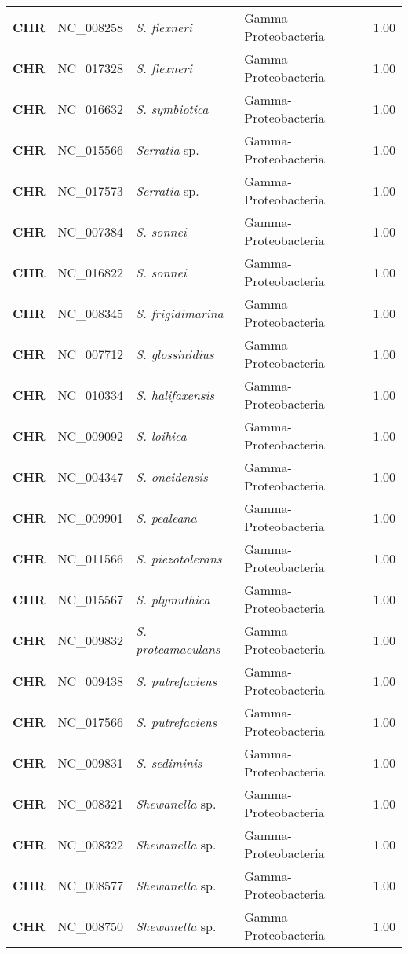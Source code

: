 \begin{adjustwidth}{-3cm}{2cm}
{\begin{supertabular}{>{\bfseries}l|p{0.1\textwidth}p{0.14\textwidth}l|l}
CHR & NC\_008258 & \textit{S. flexneri} & Gamma-Proteobacteria & 1.00\\
CHR & NC\_017328 & \textit{S. flexneri} & Gamma-Proteobacteria & 1.00\\
CHR & NC\_016632 & \textit{S. symbiotica} & Gamma-Proteobacteria & 1.00\\
CHR & NC\_015566 & \textit{Serratia} sp. & Gamma-Proteobacteria & 1.00\\
CHR & NC\_017573 & \textit{Serratia} sp. & Gamma-Proteobacteria & 1.00\\
CHR & NC\_007384 & \textit{S. sonnei} & Gamma-Proteobacteria & 1.00\\
CHR & NC\_016822 & \textit{S. sonnei} & Gamma-Proteobacteria & 1.00\\
CHR & NC\_008345 & \textit{S. frigidimarina} & Gamma-Proteobacteria & 1.00\\
CHR & NC\_007712 & \textit{S. glossinidius} & Gamma-Proteobacteria & 1.00\\
CHR & NC\_010334 & \textit{S. halifaxensis} & Gamma-Proteobacteria & 1.00\\
CHR & NC\_009092 & \textit{S. loihica} & Gamma-Proteobacteria & 1.00\\
CHR & NC\_004347 & \textit{S. oneidensis} & Gamma-Proteobacteria & 1.00\\
CHR & NC\_009901 & \textit{S. pealeana} & Gamma-Proteobacteria & 1.00\\
CHR & NC\_011566 & \textit{S. piezotolerans} & Gamma-Proteobacteria & 1.00\\
CHR & NC\_015567 & \textit{S. plymuthica} & Gamma-Proteobacteria & 1.00\\
CHR & NC\_009832 & \textit{S. proteamaculans} & Gamma-Proteobacteria & 1.00\\
CHR & NC\_009438 & \textit{S. putrefaciens} & Gamma-Proteobacteria & 1.00\\
CHR & NC\_017566 & \textit{S. putrefaciens} & Gamma-Proteobacteria & 1.00\\
CHR & NC\_009831 & \textit{S. sediminis} & Gamma-Proteobacteria & 1.00\\
CHR & NC\_008321 & \textit{Shewanella} sp. & Gamma-Proteobacteria & 1.00\\
CHR & NC\_008322 & \textit{Shewanella} sp. & Gamma-Proteobacteria & 1.00\\
CHR & NC\_008577 & \textit{Shewanella} sp. & Gamma-Proteobacteria & 1.00\\
CHR & NC\_008750 & \textit{Shewanella} sp. & Gamma-Proteobacteria & 1.00\\

\end{supertabular}}
\end{adjustwidth}
